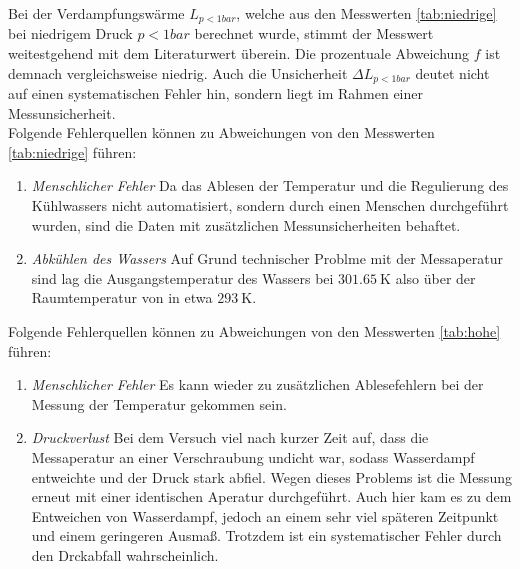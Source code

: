 Bei der Verdampfungswärme $L_{p<1bar}$, welche aus den Messwerten \ref{tab:niedrige} bei niedrigem 
Druck $p<1bar$ berechnet wurde, stimmt der Messwert weitestgehend mit dem Literaturwert überein. Die
prozentuale Abweichung $f$ ist demnach vergleichsweise niedrig. Auch die Unsicherheit 
$\Delta L_{p<1bar}$ deutet nicht auf einen systematischen Fehler hin, sondern liegt im Rahmen einer
Messunsicherheit.\\
Folgende Fehlerquellen können zu Abweichungen von den Messwerten \ref{tab:niedrige} führen:
\begin{enumerate}
  \item \textit{Menschlicher Fehler}
    Da das Ablesen der Temperatur und die Regulierung des Kühlwassers nicht automatisiert, sondern durch 
    einen Menschen durchgeführt wurden, sind die Daten mit zusätzlichen Messunsicherheiten behaftet.
  \item \textit{Abkühlen des Wassers}
    Auf Grund technischer Problme mit der Messaperatur sind lag die Ausgangstemperatur des Wassers
    bei $\SI{301.65}{\kelvin}$ also über der Raumtemperatur von in etwa $\SI{293}{\kelvin}$.
\end{enumerate}
Folgende Fehlerquellen können zu Abweichungen von den Messwerten \ref{tab:hohe} führen:
\begin{enumerate}
  \item \textit{Menschlicher Fehler}
    Es kann wieder zu zusätzlichen Ablesefehlern bei der Messung der Temperatur gekommen sein.
  \item \textit{Druckverlust}
    Bei dem Versuch viel nach kurzer Zeit auf, dass die Messaperatur an einer Verschraubung undicht war,
    sodass Wasserdampf entweichte und der Druck stark abfiel. Wegen dieses Problems ist die Messung
    erneut mit einer identischen Aperatur durchgeführt. Auch hier kam es zu dem Entweichen von Wasserdampf,
    jedoch an einem sehr viel späteren Zeitpunkt und einem geringeren Ausmaß. Trotzdem ist ein systematischer
    Fehler durch den Drckabfall wahrscheinlich.
\end{enumerate}